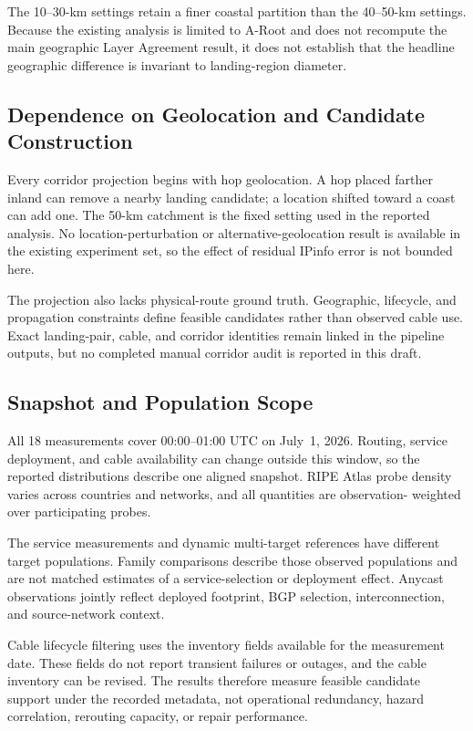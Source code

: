 The 10--30-km settings retain a finer coastal partition than the 40--50-km
settings. Because the existing analysis is limited to A-Root and does not
recompute the main geographic Layer Agreement result, it does not establish
that the headline geographic difference is invariant to landing-region
diameter.

\subsection{Dependence on Geolocation and Candidate Construction}

Every corridor projection begins with hop geolocation. A hop placed farther
inland can remove a nearby landing candidate; a location shifted toward a coast
can add one. The 50-km catchment is the fixed setting used in the reported
analysis. No location-perturbation or alternative-geolocation result is
available in the existing experiment set, so the effect of residual IPinfo
error is not bounded here.

The projection also lacks physical-route ground truth. Geographic, lifecycle,
and propagation constraints define feasible candidates rather than observed
cable use. Exact landing-pair, cable, and corridor identities remain linked in
the pipeline outputs, but no completed manual corridor audit is reported in
this draft.

\subsection{Snapshot and Population Scope}

All 18 measurements cover 00:00--01:00 UTC on July~1, 2026. Routing, service
deployment, and cable availability can change outside this window, so the
reported distributions describe one aligned snapshot. RIPE Atlas probe density
varies across countries and networks, and all quantities are observation-
weighted over participating probes.

The service measurements and dynamic multi-target references have different
target populations. Family comparisons describe those observed populations
and are not matched estimates of a service-selection or deployment effect.
Anycast observations jointly reflect deployed footprint, BGP selection,
interconnection, and source-network context.

Cable lifecycle filtering uses the inventory fields available for the
measurement date. These fields do not report transient failures or outages,
and the cable inventory can be revised. The results therefore measure feasible
candidate support under the recorded metadata, not operational redundancy,
hazard correlation, rerouting capacity, or repair performance.
